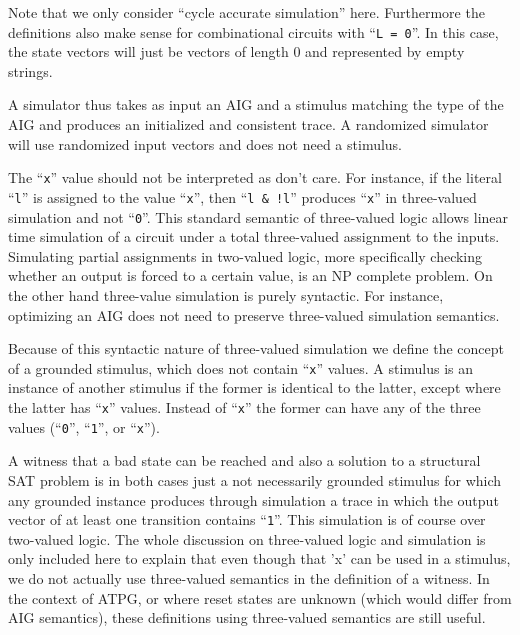 \documentclass{llncs}
\begin{document}
  Note that we only consider ``cycle accurate simulation'' here.  Furthermore
  the definitions also make sense for combinational circuits with ``\texttt{L =
  0}''.
  In this case, the state vectors will just be vectors of length 0 and
  represented by empty strings.

  A simulator thus takes as input an AIG and a stimulus matching the type
  of the AIG and produces an initialized and consistent trace.  A randomized
  simulator will use randomized input vectors and does not need a stimulus.

  The ``\texttt{x}'' value should not be interpreted as don't care.  For instance, if
  the literal ``\texttt{l}'' is assigned to the value ``\texttt{x}'', then
  ``\texttt{l \& !l}'' produces ``\texttt{x}''
  in three-valued simulation and not ``\texttt{0}''.  This standard semantic of
  three-valued logic allows linear time simulation of a circuit under a
  total three-valued assignment to the inputs.  Simulating partial
  assignments in two-valued logic, more specifically checking whether an
  output is forced to a certain value, is an NP complete problem.  On the
  other hand three-value simulation is purely syntactic.  For instance,
  optimizing an AIG does not need to preserve three-valued simulation
  semantics.

  Because of this syntactic nature of three-valued simulation we define the
  concept of a grounded stimulus, which does not contain ``\texttt{x}'' values.
  A stimulus is an instance of another stimulus if the former is identical
  to the latter, except where the latter has ``\texttt{x}'' values.  Instead of
  ``\texttt{x}'' the
  former can have any of the three values (``\texttt{0}'', ``\texttt{1}'', or ``\texttt{x}'').

  A witness that a bad state can be reached and also a solution to a
  structural SAT problem is in both cases just a not necessarily grounded
  stimulus for which any grounded instance produces through simulation a
  trace in which the output vector of at least one transition contains
  ``\texttt{1}''.
  This simulation is of course over two-valued logic.  The whole discussion
  on three-valued logic and simulation is only included here to explain that
  even though that 'x' can be used in a stimulus, we do not actually use
  three-valued semantics in the definition of a witness.  In the context
  of ATPG, or where reset states are unknown (which would differ from AIG
  semantics), these definitions using three-valued semantics are still
  useful.
\end{document}
